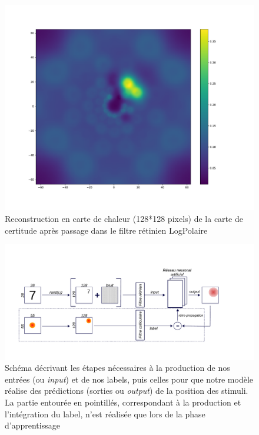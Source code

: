\begin{figure}[th]
\centering
\includegraphics[scale=0.4]{Figures/accuracy_128_LP}
\decoRule
\caption[Figure]{Reconstruction en carte de chaleur (128*128 pixels) de la carte de certitude après passage dans le filtre rétinien LogPolaire}
\label{fig:accuracy_128_LP}
\end{figure}

\begin{figure}[th]
\centering
\includegraphics[scale=0.65]{Figures/Model}
\decoRule
\caption[Figure]{Schéma décrivant les étapes nécessaires à la production de nos entrées (ou \textit{input}) et de nos labels, puis celles pour que notre modèle réalise des prédictions (sorties ou \textit{output}) de la position des stimuli. La partie entourée en pointillés, correspondant à la production et l'intégration du label, n'est réalisée que lors de la phase d'apprentissage}
\label{fig:model}
\end{figure}

